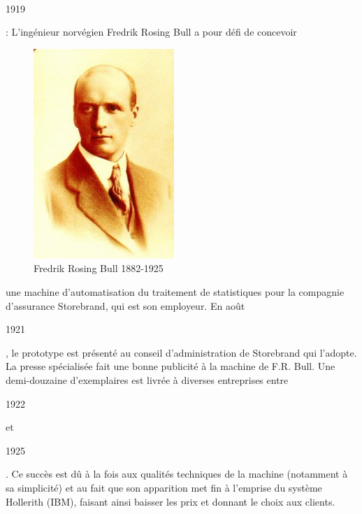 \documentclass{article}
\begin{document}
		\paragraph{}
		\begin{bf}1919\end{bf} : L’ingénieur norvégien Fredrik Rosing Bull a pour défi de concevoir 
		\begin{figure}
		\includegraphics[scale=0.75]{FredrikRosingBull.jpg}
		\caption{Fredrik Rosing Bull 1882-1925}
		\end{figure}
		une machine d’automatisation du traitement de statistiques pour la compagnie d’assurance Storebrand, qui est son employeur. 
		En août \begin{bf}1921\end{bf}, le prototype est présenté au conseil d'administration de Storebrand qui l'adopte. 
		La presse spécialisée fait une bonne publicité à la machine de F.R. Bull. Une demi-douzaine d'exemplaires est livrée à diverses entreprises 
		entre \begin{bf}1922\end{bf} et \begin{bf}1925\end{bf}. Ce succès est dû à la fois aux qualités techniques de la 
		machine (notamment à sa simplicité) et au fait que son apparition met fin à l'emprise du système Hollerith (IBM), 
		faisant ainsi baisser les prix et donnant le choix aux clients.
		\newline{}
		\newline{}
		\newline{}
		\newline{}
		\newline{}
		\newline{}
		\newline{}
		\newline{}
\end{document}

